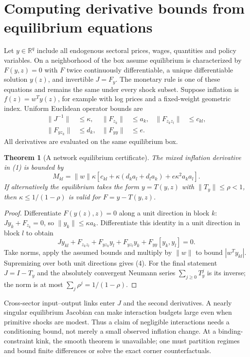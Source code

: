 \documentclass[11pt]{article}
\newtheorem{theorem}{Theorem}
\theoremstyle{remark}
\newcommand{\R}{\mathbb R}
\begin{document}
\section{Computing derivative bounds from equilibrium equations}
Let $y\in\R^q$ include all endogenous sectoral prices, wages, quantities
and policy variables. On a neighborhood of the box assume equilibrium is
characterized by $F(y,z)=0$ with $F$ twice continuously differentiable,
a unique differentiable solution $y(z)$, and invertible
$J=F_y$. The monetary rule is one of these equations and remains the same
under every shock subset. Suppose inflation is $f(z)=w^Ty(z)$, for
example with log prices and a fixed-weight geometric index.
Uniform Euclidean operator bounds are
\begin{align*}
 \|J^{-1}\|&\leq\kappa,&\|F_{z_k}\|&\leq a_k,&
 \|F_{z_kz_l}\|&\leq c_{kl},\\
 \|F_{yz_k}\|&\leq d_k,&\|F_{yy}\|&\leq e.
\end{align*}
All derivatives are evaluated on the same equilibrium box.

\begin{theorem}[A network equilibrium certificate]
The mixed inflation derivative in (1) is bounded by
\[
 M_{kl}=\|w\|\kappa\left[
 c_{kl}+\kappa(d_ka_l+d_la_k)+e\kappa^2a_ka_l\right].             \tag{4}
\]
If alternatively the equilibrium takes the form $y=T(y,z)$ with
$\|T_y\|\leq\rho<1$, then $\kappa\leq1/(1-\rho)$ is valid for
$F=y-T(y,z)$.
\end{theorem}
\begin{proof}
Differentiate $F(y(z),z)=0$ along a unit direction in block $k$:
$Jy_k+F_{z_k}=0$, so $\|y_k\|\leq\kappa a_k$.
Differentiate this identity in a unit direction in block $l$ to obtain
\[
 Jy_{kl}+F_{z_kz_l}+F_{yz_k}y_l+
 F_{yz_l}y_k+F_{yy}[y_k,y_l]=0.
\]
Take norms, apply the assumed bounds and multiply by $\|w\|$ to
bound $|w^Ty_{kl}|$. Supremizing over both unit directions gives (4).
For the final statement $J=I-T_y$ and the absolutely convergent Neumann
series $\sum_{j\geq0}T_y^j$ is its inverse; the norm is at most
$\sum_j\rho^j=1/(1-\rho)$.
\end{proof}
Cross-sector input--output links enter $J$ and the second derivatives.
A nearly singular equilibrium Jacobian can make interaction budgets large
even when primitive shocks are modest. Thus a claim of negligible
interactions needs a conditioning bound, not merely a small observed
inflation change. At a binding-constraint kink, the smooth theorem is
unavailable; one must partition regimes and bound finite differences or
solve the exact corner counterfactuals.
\end{document}
